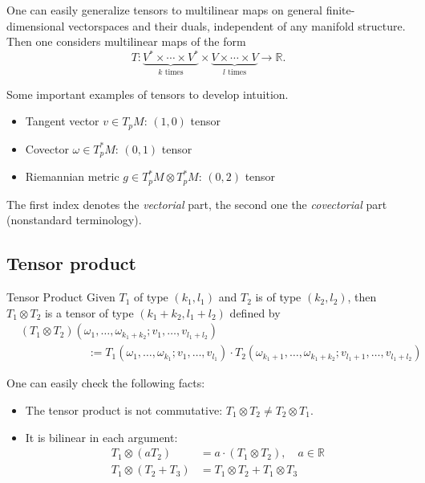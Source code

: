 \begin{colremark}
\label{rem:general_tensors}
One can easily generalize tensors to multilinear maps on general finite-dimensional vectorspaces and their duals, independent of any manifold structure. Then one considers multilinear maps of the form
\[T: \underbrace{V^* \times \cdots \times V^*}_{k \text{ times}} \times \underbrace{V \times \cdots \times V}_{l \text{ times}} \longrightarrow \mathbb{R}.\]
\end{colremark}

\begin{colexample}{}{}
Some important examples of tensors to develop intuition.
\begin{itemize}
\item Tangent vector $v\in T_p M$: $(1,0)$ tensor
\item Covector $\omega \in T_p^* M$: $(0,1)$ tensor
\item Riemannian metric $g \in T_p^* M \otimes T_p^* M$: $(0,2)$ tensor
\end{itemize}
The first index denotes the \emph{vectorial} part, the second one the \emph{covectorial} part (nonstandard terminology).
\end{colexample}




\subsection{Tensor product}
\begin{colordef}{Tensor Product}{}
Given $T_1$ of type $(k_1, l_1)$ and $T_2$ is of type $(k_2, l_2)$, then $T_1 \otimes T_2$ is a tensor of type $(k_1 + k_2, l_1 + l_2)$ defined by
\begin{align*}
    &(T_1 \otimes T_2)(\omega_1, \ldots,  \omega_{k_1+k_2}; v_1, \ldots, v_{l_1+l_2})
    \\&\qquad\qquad\qquad
    := T_1(\omega_1, \ldots, \omega_{k_1}; v_1, \ldots, v_{l_1}) \cdot T_2(\omega_{k_1+1}, \ldots, \omega_{k_1+k_2}; v_{l_1+1}, \ldots, v_{l_1+l_2})
\end{align*}
\end{colordef}

One can easily check the following facts:

\begin{itemize}[itemsep=0pt, topsep=0pt]
    \item The tensor product is not commutative: $T_1 \otimes T_2 \neq T_2 \otimes T_1$.
    \item
It is bilinear in each argument:
\begin{align*}
    T_1 \otimes (a T_2) &= a \cdot (T_1 \otimes T_2), \quad a \in \mathbb{R}\\
    T_1 \otimes (T_2 + T_3) &= T_1 \otimes T_2 + T_1 \otimes T_3
\end{align*}
\end{itemize}




